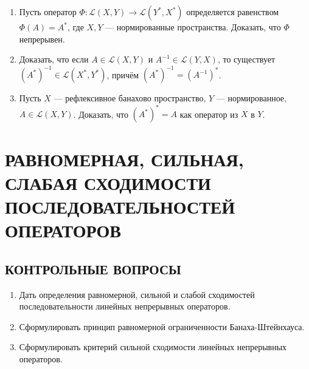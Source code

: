 \documentclass[12pt,a4paper]{article}
\begin{document}
\begin{enumerate}
\item Пусть оператор $\Phi: \mathcal{L}(X,Y) \rightarrow \mathcal{L}(Y^{*},X^{*})$ определяется равенством $\Phi(A) = A^{*}$, где $X, Y$ — нормированные пространства. Доказать, что $\Phi$ непрерывен.

\item Доказать, что если $A \in \mathcal{L}(X,Y)$ и $A^{-1} \in \mathcal{L}(Y,X)$, то существует $(A^{*})^{-1} \in \mathcal{L}(X^{*},Y^{*})$, причём $(A^{*})^{-1} = (A^{-1})^{*}$.

\item Пусть $X$ — рефлексивное банахово пространство, $Y$ — нормированное, $A \in \mathcal{L}(X,Y)$. Доказать, что $(A^{*})^{*} = A$ как оператор из $X$ в $Y$.
\end{enumerate}

\section{РАВНОМЕРНАЯ, СИЛЬНАЯ, СЛАБАЯ СХОДИМОСТИ ПОСЛЕДОВАТЕЛЬНОСТЕЙ ОПЕРАТОРОВ}

\subsection*{КОНТРОЛЬНЫЕ ВОПРОСЫ}
\begin{enumerate}
\item Дать определения равномерной, сильной и слабой сходимостей последовательности линейных непрерывных операторов.
\item Сформулировать принцип равномерной ограниченности Банаха-Штейнхауса.
\item Сформулировать критерий сильной сходимости линейных непрерывных операторов.
\end{enumerate}
\end{document}
